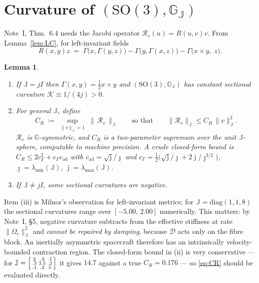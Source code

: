 \documentclass[11pt,a4paper]{article}
\newcommand{\Gm}{\mathbb{G}}
\newcommand{\Jm}{\mathbb{J}}
\newcommand{\Jac}{\mathcal{R}}
\newcommand{\Sect}{\mathcal{K}}
\newcommand{\Damp}{\mathcal{D}}
\newcommand{\normJ}[1]{\lVert #1 \rVert_{\Jm}}
\newcommand{\SO}{\mathrm{SO}(3)}
\newcommand{\ad}{\operatorname{ad}}
\newcommand{\Ome}{\Omega_{\!e}}
\theoremstyle{plain}
\newtheorem{lemma}[theorem]{Lemma}
\theoremstyle{definition}
\theoremstyle{remark}
\begin{document}
\section{Curvature of $(\SO,\Gm_{\Jm})$}
\label{sec:so3-curv}

Note~I, Thm.~6.4 needs the Jacobi operator $\Jac_v(u)=R(u,v)v$. From
Lemma~\ref{lem:LC}, for left-invariant fields
\begin{equation}
  R(x,y)z \;=\; \Gamma\big(x,\Gamma(y,z)\big) - \Gamma\big(y,\Gamma(x,z)\big)
                - \Gamma\big(x\times y,\;z\big).
  \label{eq:curv}
\end{equation}

\begin{lemma}
\label{lem:curv}
\begin{enumerate}[label=(\roman*),leftmargin=2.1em,itemsep=2pt,topsep=2pt]
\item If $\Jm = jI$ then $\Gamma(x,y)=\tfrac12 x\times y$ and $(\SO,\Gm_{\Jm})$ has
      constant sectional curvature $\Sect \equiv 1/(4j) > 0$.
\item For general $\Jm$, define
      \begin{equation}
        C_R \;\coloneqq\; \sup_{\normJ{v}=1}\; \big\|\,\Jac_v\,\big\|_{\Jm}
        \qquad\text{so that}\qquad
        \big\|\Jac_v\big\|_{\Jm} \le C_R\,\normJ{v}^2 .
        \label{eq:CR}
      \end{equation}
      $\Jac_v$ is $\Gm$-symmetric, and $C_R$ is a two-parameter supremum over the
      unit $\Jm$-sphere, computable to machine precision. A crude closed-form
      bound is $C_R \le 2c_\Gamma^2 + c_\Gamma c_{\ad}$ with
      $c_{\ad} = \sqrt{\bar\jmath}/\underline\jmath$ and
      $c_\Gamma = \tfrac12\big(\sqrt{\bar\jmath}/\underline\jmath + 2\bar\jmath/\underline\jmath^{3/2}\big)$,
      $\underline\jmath = \lambda_{\min}(\Jm)$, $\bar\jmath = \lambda_{\max}(\Jm)$.
\item If $\Jm \ne jI$, some sectional curvatures are negative.
\end{enumerate}
\end{lemma}

Item (iii) is Milnor's observation for left-invariant metrics; for
$\Jm=\mathrm{diag}(1,1,8)$ the sectional curvatures range over
$[-5.00,\,2.00]$ numerically. This matters: by Note~I, \S5, negative curvature
subtracts from the effective stiffness at rate $\normJ{\Ome}^2$ and \emph{cannot be
repaired by damping}, because $\Damp$ acts only on the fibre block. An inertially
asymmetric spacecraft therefore has an intrinsically velocity-bounded contraction
region. The closed-form bound in (ii) is very conservative --- for
$\Jm = \begin{bsmallmatrix}2&.3&.1\\.3&3.5&.2\\.1&.2&5\end{bsmallmatrix}$ it gives
$14.7$ against a true $C_R = 0.176$ --- so \eqref{eq:CR} should be evaluated
directly.
\end{document}
